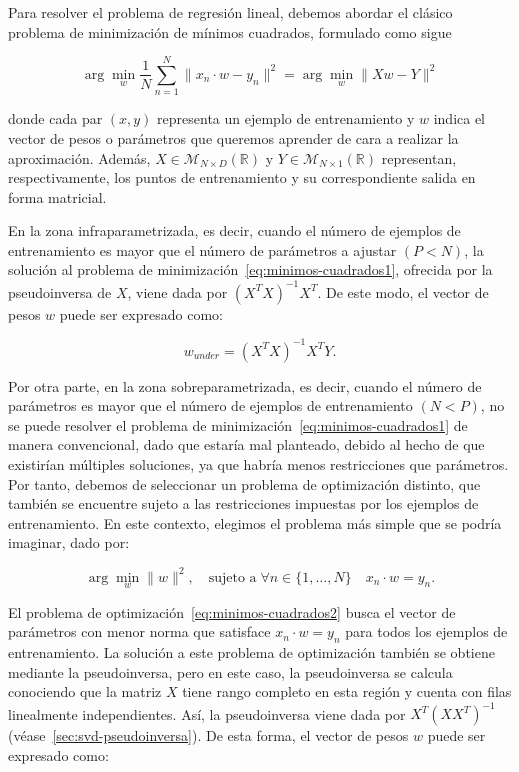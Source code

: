 Para resolver el problema de regresión lineal, debemos abordar el clásico problema de minimización de mínimos cuadrados, formulado como sigue

\begin{equation}\label{eq:minimos-cuadrados1}
    \arg\min_{w} \frac{1}{N}\sum_{n=1}^{N}\| x_n \cdot w - y_n \|^{2} = \arg\min_{w}\| Xw - Y \|^{2}
\end{equation}

donde cada par $(x, y)$ representa un ejemplo de entrenamiento y $w$ indica el vector de pesos o parámetros que queremos aprender de cara a realizar la aproximación. Además, $X \in \mathcal{M}_{N \times D}(\mathbb{R})$ y $Y\in \mathcal{M}_{N \times 1}(\mathbb{R})$ representan, respectivamente, los puntos de entrenamiento y su correspondiente salida en forma matricial.\newline

En la zona infraparametrizada, es decir, cuando el número de ejemplos de entrenamiento es mayor que el número de parámetros a ajustar $(P < N)$, la solución al problema de minimización~\eqref{eq:minimos-cuadrados1}, ofrecida por la pseudoinversa de $X$, viene dada por ${(X^{T}X)}^{-1}X^{T}$. De este modo, el vector de pesos $w$ puede ser expresado como:

\begin{equation}
    w_{under} = {(X^{T}X)}^{-1}X^{T}Y.
\end{equation}\newline

Por otra parte, en la zona sobreparametrizada, es decir, cuando el número de parámetros es mayor que el número de ejemplos de entrenamiento $(N < P)$, no se puede resolver el problema de minimización~\eqref{eq:minimos-cuadrados1} de manera convencional, dado que estaría mal planteado, debido al hecho de que existirían múltiples soluciones, ya que habría menos restricciones que parámetros. Por tanto, debemos de seleccionar un problema de optimización distinto, que también se encuentre sujeto a las restricciones impuestas por los ejemplos de entrenamiento. En este contexto, elegimos el problema más simple que se podría imaginar, dado por:

\begin{equation}\label{eq:minimos-cuadrados2}
    \arg\min_{w}\| w \|^{2}, \quad \text{sujeto a} \; \forall n \in \{1, \ldots, N\} \quad x_n \cdot w = y_n.
\end{equation}\newline

El problema de optimización~\eqref{eq:minimos-cuadrados2} busca el vector de parámetros con menor norma que satisface $x_n \cdot w = y_n$ para todos los ejemplos de entrenamiento. La solución a este problema de optimización también se obtiene mediante la pseudoinversa, pero en este caso, la pseudoinversa se calcula conociendo que la matriz $X$ tiene rango completo en esta región y cuenta con filas linealmente independientes. Así, la pseudoinversa viene dada por $X^{T}{(XX^{T})}^{-1}$ (véase~\ref{sec:svd-pseudoinversa}). De esta forma, el vector de pesos $w$ puede ser expresado como:

